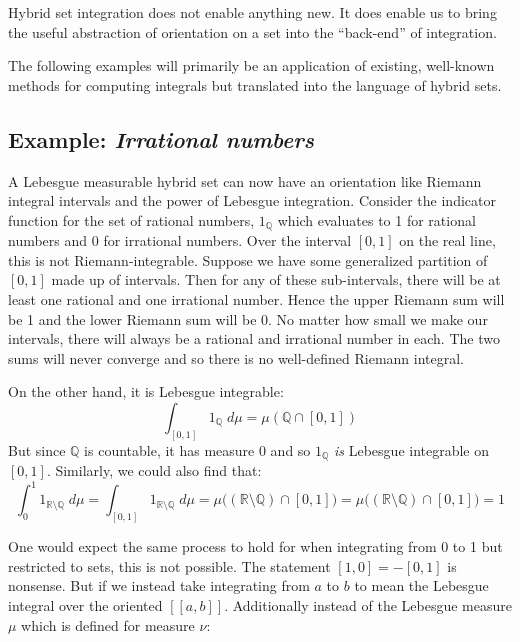 Hybrid set integration does not enable anything new.
It does enable us to bring the useful abstraction of orientation on a set into the ``back-end'' of integration.

The following examples will primarily be an application of existing, well-known methods for computing integrals but 
translated into the language of hybrid sets.


\subsection{Example: \emph{Irrational numbers}}

A Lebesgue measurable hybrid set can now have an orientation like Riemann integral intervals 
and the power of Lebesgue integration.
Consider the indicator function for the set of rational numbers, $1_\mathbb{Q}$ which evaluates to 
1 for rational numbers and 0 for irrational numbers.
Over the interval $[0,1]$ on the real line, this is not Riemann-integrable.
Suppose we have some generalized partition of $[0,1]$ made up of intervals.
Then for any of these sub-intervals, there will be at least one rational and one irrational number.
Hence the upper Riemann sum will be 1 and the lower Riemann sum will be 0.
No matter how small we make our intervals, there will always be a rational and irrational number in each.
The two sums will never converge and so there is no well-defined Riemann integral.


On the other hand, it is Lebesgue integrable:
\begin{equation}
	\int_{[0,1]} 1_\mathbb{Q} \; d\mu = \mu(\mathbb{Q} \cap [0,1])
\end{equation}
But since $\mathbb{Q}$ is countable, it has measure 0 and so $1_\mathbb{Q}$ \emph{is} Lebesgue integrable on $[0,1]$.
Similarly, we could also find that:
\begin{equation}
	\int_0^1 1_{\mathbb{R}\setminus \mathbb{Q}} \;d\mu
		= \int_{[0,1]} 1_{\mathbb{R}\setminus \mathbb{Q}} \;d\mu
		= \mu \big( (\mathbb{R}\setminus\mathbb{Q}) \cap [0,1] \big)
		= \mu \big( (\mathbb{R}\setminus\mathbb{Q}) \cap [0,1] \big)
		= 1
\end{equation}

One would expect the same process to hold for when integrating from 0 to 1 but restricted to sets, this is not possible.
The statement $[1,0] = -[0,1]$ is nonsense.
But if we instead take integrating from $a$ to $b$ to mean the Lebesgue integral over the oriented $[\![a,b]\!]$.
Additionally instead of the Lebesgue measure $\mu$ which is defined for 
measure $\nu$:

